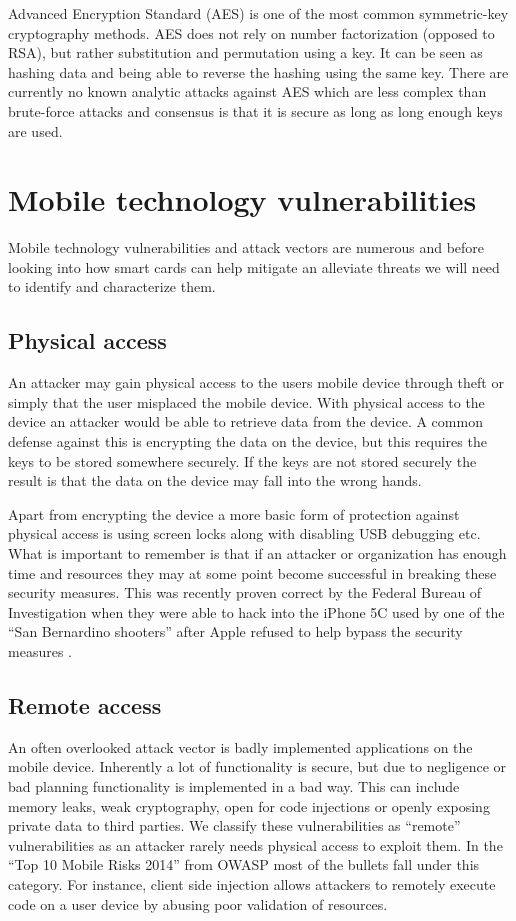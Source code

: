 Advanced Encryption Standard (AES) is one of the most common symmetric-key cryptography methods. AES does not rely on number factorization (opposed to RSA), but rather substitution and permutation using a key. It can be seen as hashing data and being able to reverse the hashing using the same key. There are currently no known analytic attacks against AES which are less complex than brute-force attacks and consensus is that it is secure as long as long enough keys are used.

\section{Mobile technology vulnerabilities}
Mobile technology vulnerabilities and attack vectors are numerous and before looking into how smart cards can help mitigate an alleviate threats we will need to identify and characterize them.

\subsection{Physical access}
An attacker may gain physical access to the users mobile device through theft or simply that the user misplaced the mobile device. With physical access to the device an attacker would be able to retrieve data from the device. A common defense against this is encrypting the data on the device, but this requires the keys to be stored somewhere securely. If the keys are not stored securely the result is that the data on the device may fall into the wrong hands.

Apart from encrypting the device a more basic form of protection against physical access is using screen locks along with disabling USB debugging etc. What is important to remember is that if an attacker or organization has enough time and resources they may at some point become successful in breaking these security measures. This was recently proven correct by the Federal Bureau of Investigation when they were able to hack into the iPhone 5C used by one of the ``San Bernardino shooters'' after Apple refused to help bypass the security measures \cite{iphoneHack}.

\subsection{Remote access}
An often overlooked attack vector is badly implemented applications on the mobile device. Inherently a lot of functionality is secure, but due to negligence or bad planning functionality is implemented in a bad way. This can include memory leaks, weak cryptography, open for code injections or openly exposing private data to third parties. We classify these vulnerabilities as ``remote'' vulnerabilities as an attacker rarely needs physical access to exploit them. In the ``Top 10 Mobile Risks 2014'' from OWASP \cite{OWASPTopTenMobile} most of the bullets fall under this category. For instance, client side injection allows attackers to remotely execute code on a user device by abusing poor validation of resources.


